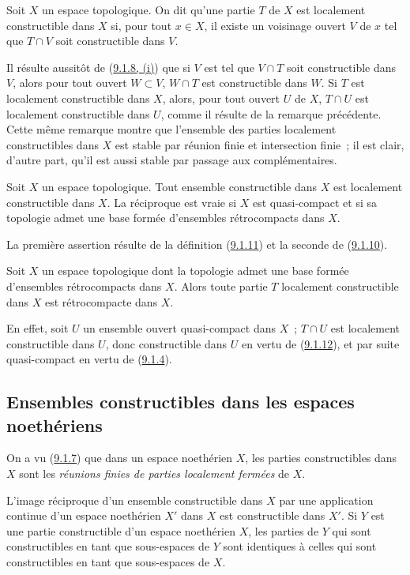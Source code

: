 \begin{definition}[9.1.11]
\label{0.9.1.11-fr}
Soit $X$ un espace topologique. On dit qu'une partie $T$ de $X$ est
localement constructible dans $X$ si, pour tout $x\in X$, il existe
un voisinage ouvert $V$ de $x$ tel que $T\cap V$ soit constructible dans $V$.
\end{definition}

Il résulte aussitôt de (\hyperref[0.9.1.8-fr]{9.1.8, (i)}) que si $V$ est
tel que $V\cap T$ soit constructible dans $V$, alors pour tout ouvert
$W\subset V$, $W\cap T$ est constructible dans $W$. Si $T$ est localement
constructible dans $X$, alors, pour tout ouvert $U$ de $X$, $T\cap U$ est
localement constructible dans $U$, comme il résulte de la remarque
précédente. Cette même remarque montre que l'ensemble des parties localement
constructibles dans $X$ est stable par réunion finie et intersection finie~;
il est clair, d'autre part, qu'il est aussi stable par passage aux
complémentaires.

\begin{proposition}[9.1.12]
\label{0.9.1.12-fr}
Soit $X$ un espace topologique. Tout ensemble constructible dans $X$ est
localement constructible dans $X$. La réciproque est vraie si $X$ est
quasi-compact et si sa topologie admet une base formée d'ensembles
rétrocompacts dans $X$.
\end{proposition}

La première assertion résulte de la définition
(\hyperref[0.9.1.11-fr]{9.1.11}) et la seconde de
(\hyperref[0.9.1.10-fr]{9.1.10}).

\begin{corollary}[9.1.13]
\label{0.9.1.13-fr}
Soit $X$ un espace topologique dont la topologie admet une base formée
d'ensembles rétrocompacts dans $X$. Alors toute partie $T$ localement
constructible dans $X$ est rétrocompacte dans $X$.
\end{corollary}

En effet, soit $U$ un ensemble ouvert quasi-compact dans $X$~; $T\cap U$ est
localement constructible dans $U$, donc constructible dans $U$ en vertu de
(\hyperref[0.9.1.12-fr]{9.1.12}), et par suite quasi-compact en vertu de
(\hyperref[0.9.1.4-fr]{9.1.4}).

\subsection{Ensembles constructibles dans les espaces noethériens}
\label{subsection:0.9.2-fr}

\begin{env}[9.2.1]
\label{0.9.2.1-fr}
On a vu (\hyperref[0.9.1.7-fr]{9.1.7}) que dans un espace noethérien $X$, les
parties constructibles dans $X$ sont les \emph{réunions finies de parties
localement fermées} de $X$.

L'image réciproque d'un ensemble constructible dans $X$ par une application
continue d'un espace noethérien $X'$ dans $X$ est constructible dans $X'$.
Si $Y$ est une partie constructible d'un espace noethérien $X$, les parties
de $Y$ qui sont constructibles en tant que sous-espaces de $Y$ sont
identiques à celles qui sont constructibles en tant que sous-espaces de $X$.
\end{env}

